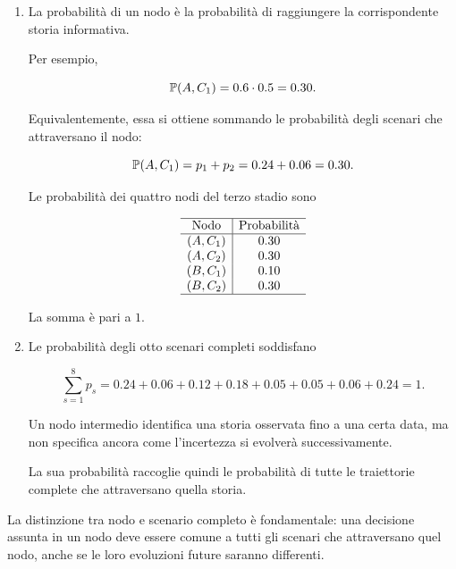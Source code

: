 \begin{enumerate}
\item La probabilit\`a di un nodo
\`e la probabilit\`a di raggiungere
la corrispondente storia informativa.

Per esempio,

\[
\mathbb{P}(A,C_1)
=
0.6\cdot0.5
=
0.30.
\]

Equivalentemente, essa si ottiene
sommando le probabilit\`a
degli scenari che attraversano il nodo:

\[
\mathbb{P}(A,C_1)
=
p_1+p_2
=
0.24+0.06
=
0.30.
\]

Le probabilit\`a dei quattro nodi
del terzo stadio sono

\[
\begin{array}{c|c}
\hline
\text{Nodo}
&
\text{Probabilit\`a}\\
\hline
(A,C_1)&0.30\\
(A,C_2)&0.30\\
(B,C_1)&0.10\\
(B,C_2)&0.30\\
\hline
\end{array}
\]

La somma \`e pari a $1$.

\item Le probabilit\`a
degli otto scenari completi soddisfano

\[
\sum_{s=1}^{8}p_s
=
0.24+0.06+0.12+0.18
+0.05+0.05+0.06+0.24
=
1.
\]

Un nodo intermedio identifica
una storia osservata fino a una certa data,
ma non specifica ancora
come l'incertezza si evolver\`a
successivamente.

La sua probabilit\`a raccoglie quindi
le probabilit\`a di tutte
le traiettorie complete che attraversano
quella storia.

\end{enumerate}

La distinzione tra nodo e scenario completo
\`e fondamentale: una decisione assunta
in un nodo deve essere comune
a tutti gli scenari che attraversano
quel nodo, anche se le loro evoluzioni
future saranno differenti.




